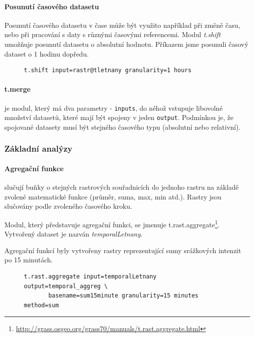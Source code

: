 \documentclass[a4paper,12pt,oneside]{report}
\begin{document}
 \paragraph*{Posunutí časového datasetu} Posunutí časového datasetu v
 čase může být využito například při změně času, nebo při pracování s
 daty s různými časovými referencemi. Modul \textit{t.shift} umožňuje
 posunutí datasetu o absolutní hodnotu. Příkazem jsme posunuli časový
 dataset o 1 hodinu dopředu.
\begin{figure}[h!]
\begin{footnotesize}
\lstset{extendedchars=false,
escapeinside=''}
\begin{lstlisting}[style=mybash]
t.shift input=rastr@tletnany granularity=1 hours
\end{lstlisting}
\end{footnotesize} 
\end{figure}



\paragraph*{t.merge} je modul, který má dva parametry -
\texttt{inputs}, do něhož vstupuje libovolné množství datasetů, které
mají být spojeny v jeden \texttt{output}. Podmínkou je, že spojované
datasety musí být stejného časového typu (absolutní nebo relativní).


\subsubsection{Základní analýzy}
\label{subsubsec:casoprostoranal} 


\paragraph{Agregační funkce} slučují buňky o stejných rastrových
souřadnicích do jednoho rastru na základě zvolené matematické funkce
(průměr, suma, max, min atd.). Rastry jsou slučovány podle zvoleného
časového kroku.

Modul, který představuje agregační funkci, se jmenuje
t.rast.aggregate\footnote{\url{http://grass.osgeo.org/grass70/manuals/t.rast.aggregate.html}}.
Vytvořený dataset je nazván \emph{temporalLetnany}.

Agregační funkcí byly vytvořeny rastry reprezentující sumy srážkových
intenzit po 15 minutách.
\begin{figure}[h!]
\begin{footnotesize}
\lstset{extendedchars=false,
escapeinside=''}
\begin{lstlisting}[style=mybash]
t.rast.aggregate input=temporalLetnany output=temporal_aggreg \
       basename=sum15minute granularity=15 minutes method=sum
\end{lstlisting}
\end{footnotesize} 
\end{figure}
\end{document}
